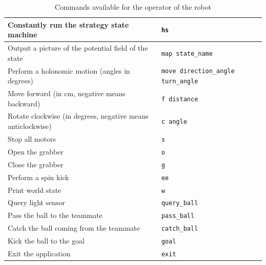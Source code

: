 \documentclass[a4paper,12pt]{article}
\begin{document}
\begin{table}[h!]
\centering
\begin{tabular}{ | p{9cm} | p{6.2cm} | }
    \hline
    Constantly run the strategy state machine &
    \small{\texttt{hs}} \\ \hline
    Output a picture of the potential field of the state &
    \small{\texttt{map state\_name}} \\ \hline
    Perform a holonomic motion (angles in degrees) &
    \small{\texttt{move direction\_angle turn\_angle}} \\ \hline
    Move forward (in cm, negative means backward) &
    \small{\texttt{f distance}} \\ \hline
    Rotate clockwise (in degrees, negative means anticlockwise) &
    \small{\texttt{c angle}} \\ \hline
    Stop all motors &
    \small{\texttt{s}} \\ \hline
    Open the grabber &
    \small{\texttt{o}} \\ \hline
    Close the grabber &
    \small{\texttt{g}} \\ \hline
    Perform a spin kick &
    \small{\texttt{ee}} \\ \hline
    Print world state &
    \small{\texttt{w}} \\ \hline
    Query light sensor &
    \small{\texttt{query\_ball}} \\ \hline
    Pass the ball to the teammate &
    \small{\texttt{pass\_ball}} \\ \hline
    Catch the ball coming from the teammate &
    \small{\texttt{catch\_ball}} \\ \hline
    Kick the ball to the goal &
    \small{\texttt{goal}} \\ \hline
    Exit the application &
    \small{\texttt{exit}} \\ \hline
\end{tabular}
\caption{Commands available for the operator of the robot}
\label{tab:commands}
\end{table}
\end{document}

